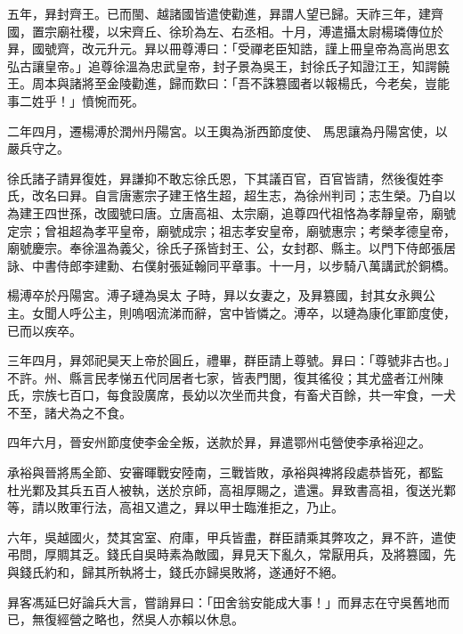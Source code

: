 \begin{pinyinscope}
 五年，昪封齊王。已而閩、越諸國皆遣使勸進，昪謂人望已歸。天祚三年，建齊國，置宗廟社稷，以宋齊丘、徐玠為左、右丞相。十月，溥遣攝太尉楊璘傳位於昪，國號齊，改元升元。昪以冊尊溥曰：「受禪老臣知誥，謹上冊皇帝為高尚思玄弘古讓皇帝。」追尊徐溫為忠武皇帝，封子景為吳王，封徐氏子知證江王，知諤饒王。周本與諸將至金陵勸進，歸而歎曰：「吾不誅篡國者以報楊氏，今老矣，豈能事二姓乎！」憤惋而死。



 二年四月，遷楊溥於潤州丹陽宮。以王輿為浙西節度使、
 馬思讓為丹陽宮使，以嚴兵守之。



 徐氏諸子請昪復姓，昪謙抑不敢忘徐氏恩，下其議百官，百官皆請，然後復姓李氏，改名曰昪。自言唐憲宗子建王恪生超，超生志，為徐州判司；志生榮。乃自以為建王四世孫，改國號曰唐。立唐高祖、太宗廟，追尊四代祖恪為孝靜皇帝，廟號定宗；曾祖超為孝平皇帝，廟號成宗；祖志孝安皇帝，廟號惠宗；考榮孝德皇帝，廟號慶宗。奉徐溫為義父，徐氏子孫皆封王、公，女封郡、縣主。以門下侍郎張居詠、中書侍郎李建勳、右僕射張延翰同平章事。十一月，以步騎八萬講武於銅橋。



 楊溥卒於丹陽宮。溥子璉為吳太
 子時，昪以女妻之，及昪篡國，封其女永興公主。女聞人呼公主，則嗚咽流涕而辭，宮中皆憐之。溥卒，以璉為康化軍節度使，已而以疾卒。



 三年四月，昪郊祀昊天上帝於圓丘，禮畢，群臣請上尊號。昪曰：「尊號非古也。」不許。州、縣言民孝悌五代同居者七家，皆表門閭，復其徭役；其尤盛者江州陳氏，宗族七百口，每食設廣席，長幼以次坐而共食，有畜犬百餘，共一牢食，一犬不至，諸犬為之不食。



 四年六月，晉安州節度使李金全叛，送款於昪，昪遣鄂州屯營使李承裕迎之。



 承裕與晉將馬全節、安審暉戰安陸南，三戰皆敗，承裕與裨將段處恭皆死，都監
 杜光鄴及其兵五百人被執，送於京師，高祖厚賜之，遣還。昪致書高祖，復送光鄴等，請以敗軍行法，高祖又遣之，昪以甲士臨淮拒之，乃止。



 六年，吳越國火，焚其宮室、府庫，甲兵皆盡，群臣請乘其弊攻之，昪不許，遣使弔問，厚賙其乏。錢氏自吳時素為敵國，昪見天下亂久，常厭用兵，及將篡國，先與錢氏約和，歸其所執將士，錢氏亦歸吳敗將，遂通好不絕。



 昪客馮延巳好論兵大言，嘗誚昪曰：「田舍翁安能成大事！」而昪志在守吳舊地而已，無復經營之略也，然吳人亦賴以休息。




\end{pinyinscope}
